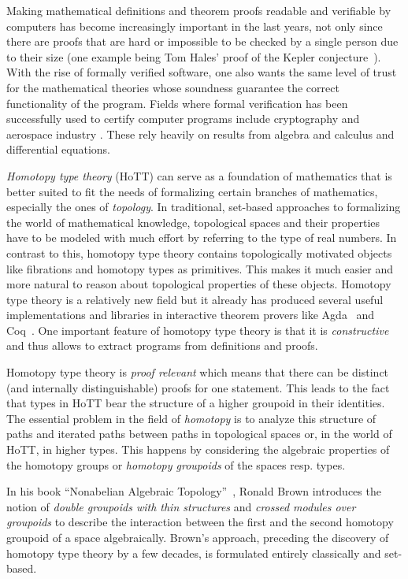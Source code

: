 Making mathematical definitions and theorem proofs readable and verifiable by
computers has become increasingly important in the last years, not only since there
are proofs that are hard or impossible to be checked by a single person due to their
size (one example being Tom Hales' proof of the Kepler conjecture~\cite{flyspeck}).
With the rise of formally verified software, one also wants the same level of trust
for the mathematical theories whose soundness guarantee the correct functionality
of the program.
Fields where formal verification has been successfully used to certify computer
programs include cryptography \cite{crypto} and aerospace industry \cite{aerospace}.
These rely heavily on results from algebra and calculus and differential equations.

\emph{Homotopy type theory} (HoTT) can serve as a foundation of mathematics
that is better suited to fit the needs of formalizing certain branches of mathematics,
especially the ones of \emph{topology}.
In traditional, set-based approaches to formalizing the world
of mathematical knowledge, topological spaces and their properties
have to be modeled with much effort by referring to the type of real numbers.
In contrast to this, homotopy type theory contains topologically motivated objects
like fibrations and homotopy types as primitives.
This makes it much easier and more natural to reason about topological properties
of these objects.
Homotopy type theory is a relatively new field but it already has produced several
useful implementations and libraries in interactive theorem provers like
Agda~\cite{hott-agda} and Coq~\cite{hott-coq}.
One important feature of homotopy
type theory is that it is \emph{constructive} and thus allows to extract programs
from definitions and proofs.

Homotopy type theory is \emph{proof relevant} which means that there can be distinct
(and internally distinguishable) proofs for one statement.
This leads to the fact that types in HoTT bear the structure of a higher groupoid
in their identities.
The essential problem in the field of \emph{homotopy} is to analyze this structure
of paths and iterated paths between paths in topological spaces or,
in the world of HoTT, in higher types.
This happens by considering the algebraic properties of the homotopy groups or
\emph{homotopy groupoids} of the spaces resp. types.

In his book ``Nonabelian Algebraic Topology''~\cite{nat}, Ronald Brown
introduces the notion of \emph{double groupoids with thin structures} and
\emph{crossed modules over groupoids} to describe the interaction between
the first and the second homotopy groupoid of a space algebraically.
Brown's approach, preceding the discovery of homotopy type theory by a few
decades, is formulated entirely classically and set-based.


